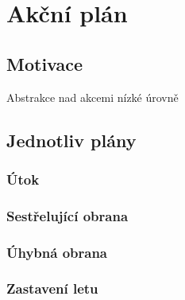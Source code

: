 \chapter{Akční plán}

\section{Motivace}
Abstrakce nad akcemi nízké úrovně

\section{Jednotliv plány}
\subsection{Útok}
\subsection{Sestřelující obrana}
\subsection{Úhybná obrana}
\subsection{Zastavení letu}




